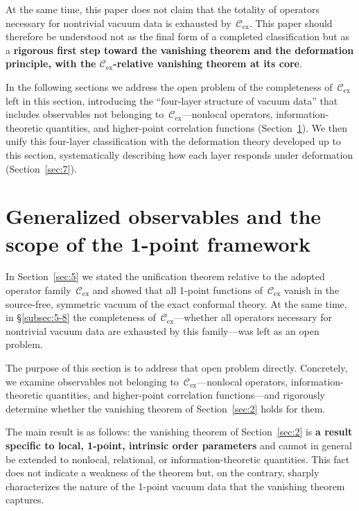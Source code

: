\documentclass[
  aps,
  prd,
  preprint,
  groupedaddress,
  nofootinbib,
  longbibliography
]{revtex4-2}
\theoremstyle{remark}
\newcommand{\Cex}{\mathcal{C}_{\mathrm{ex}}}
\begin{document}
At the same time, this paper does not claim that the totality of
operators necessary for nontrivial vacuum data is exhausted
by~$\Cex$.
This paper should therefore be understood not as the final form
of a completed classification but as a \textbf{rigorous first
step toward the vanishing theorem and the deformation principle,
with the $\Cex$-relative vanishing theorem at its core}.

In the following sections we address the open problem of the
completeness of~$\Cex$ left in this section, introducing the
``four-layer structure of vacuum data'' that includes observables
not belonging to~$\Cex$---nonlocal operators, information-theoretic
quantities, and higher-point correlation
functions (Section~\ref{sec:6}).
We then unify this four-layer classification with the deformation
theory developed up to this section, systematically describing how
each layer responds under
deformation (Section~\ref{sec:7}).

\section{Generalized observables and the scope of the 1-point
  framework}\label{sec:6}

In Section~\ref{sec:5} we stated the unification theorem relative
to the adopted operator family~$\Cex$ and showed that all 1-point
functions of~$\Cex$ vanish in the source-free, symmetric vacuum
of the exact conformal theory.
At the same time, in \S\ref{subsec:5-8} the completeness
of~$\Cex$---whether all operators necessary for nontrivial
vacuum data are exhausted by this family---was left as an open
problem.

The purpose of this section is to address that open problem
directly.
Concretely, we examine observables not belonging
to~$\Cex$---nonlocal operators, information-theoretic quantities,
and higher-point correlation functions---and rigorously determine
whether the vanishing theorem of Section~\ref{sec:2} holds for
them.

The main result is as follows: the vanishing theorem of
Section~\ref{sec:2} is \textbf{a result specific to local,
1-point, intrinsic order parameters} and cannot in general be
extended to nonlocal, relational, or information-theoretic
quantities.
This fact does not indicate a weakness of the theorem but, on
the contrary, sharply characterizes the nature of the 1-point
vacuum data that the vanishing theorem captures.
\end{document}
